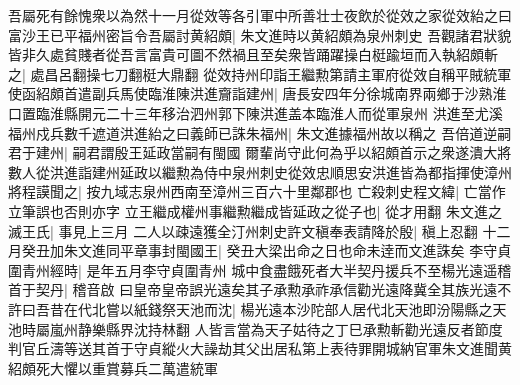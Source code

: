 吾屬死有餘愧衆以為然十一月從效等各引軍中所善壮士夜飲於從效之家從效紿之曰富沙王已平福州密旨令吾屬討黄紹頗|{
	朱文進時以黄紹頗為泉州刺史}
吾觀諸君狀貌皆非久處貧賤者從吾言富貴可圖不然禍且至矣衆皆踊躍操白梃踰垣而入執紹頗斬之|{
	處昌呂翻操七刀翻梃大鼎翻}
從效持州印詣王繼勲第請主軍府從效自稱平賊統軍使函紹頗首遣副兵馬使臨淮陳洪進齎詣建州|{
	唐長安四年分徐城南界兩鄉于沙熟淮口置臨淮縣開元二十三年移治泗州郭下陳洪進盖本臨淮人而從軍泉州}
洪進至尤溪福州戍兵數千遮道洪進紿之曰義師已誅朱福州|{
	朱文進據福州故以稱之}
吾倍道逆嗣君于建州|{
	嗣君謂殷王延政當嗣有閩國}
爾輩尚守此何為乎以紹頗首示之衆遂潰大將數人從洪進詣建州延政以繼勲為侍中泉州刺史從效忠順思安洪進皆為都指揮使漳州將程謨聞之|{
	按九域志泉州西南至漳州三百六十里鄰郡也}
亡殺刺史程文緯|{
	亡當作立筆誤也否則亦字}
立王繼成權州事繼勲繼成皆延政之從子也|{
	從才用翻}
朱文進之滅王氏|{
	事見上三月}
二人以疎遠獲全汀州刺史許文稹奉表請降於殷|{
	稹上忍翻}
十二月癸丑加朱文進同平章事封閩國王|{
	癸丑大梁出命之日也命未逹而文進誅矣}
李守貞圍青州經時|{
	是年五月李守貞圍青州}
城中食盡餓死者大半契丹援兵不至楊光遠遥稽首于契丹|{
	稽音啟}
曰皇帝皇帝誤光遠矣其子承勲承祚承信勸光遠降冀全其族光遠不許曰吾昔在代北嘗以紙錢祭天池而沈|{
	楊光遠本沙陀部人居代北天池即汾陽縣之天池時屬嵐州静樂縣界沈持林翻}
人皆言當為天子姑待之丁巳承勲斬勸光遠反者節度判官丘濤等送其首于守貞縱火大譟劫其父出居私第上表待罪開城納官軍朱文進聞黄紹頗死大懼以重賞募兵二萬遣統軍

